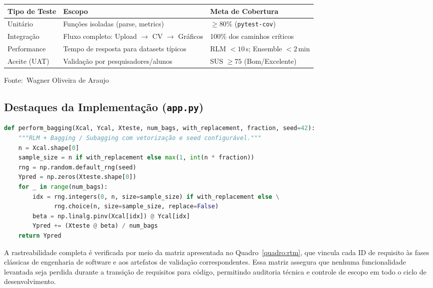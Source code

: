 \documentclass[12pt,a4paper]{article}
\newcommand{\oautor}{Wagner Oliveira de Araujo}
\begin{document}
\begin{quadro}[ht]
\centering
\small
\caption{Estratégia de testes e critérios de aceite}
\label{quadro:testes}
\begin{threeparttable}
\begin{tabularx}{\textwidth}{|l|X|X|} \hline
\textbf{Tipo de Teste} & \textbf{Escopo} & \textbf{Meta de Cobertura} \\ \hline
Unitário & Funções isoladas (parse, metrics) & $\ge 80\%$ (\texttt{pytest-cov}) \\ \hline
Integração & Fluxo completo: Upload $\rightarrow$ CV $\rightarrow$ Gráficos & 100\% dos caminhos críticos \\ \hline
Performance & Tempo de resposta para datasets típicos & RLM $< 10\,$s; Ensemble $< 2\,$min \\ \hline
Aceite (UAT) & Validação por pesquisadores/alunos & SUS $\ge 75$ (Bom/Excelente) \\ \hline
\end{tabularx}
\begin{tablenotes}[flushleft]
\footnotesize
\item Fonte:~\oautor
\end{tablenotes}
\end{threeparttable}
\end{quadro}

\subsection{Destaques da Implementação (\texttt{app.py})}
\begin{lstlisting}[language=Python]
def perform_bagging(Xcal, Ycal, Xteste, num_bags, with_replacement, fraction, seed=42):
    """RLM + Bagging / Subagging com vetorização e seed configurável."""
    n = Xcal.shape[0]
    sample_size = n if with_replacement else max(1, int(n * fraction))
    rng = np.random.default_rng(seed)
    Ypred = np.zeros(Xteste.shape[0])
    for _ in range(num_bags):
        idx = rng.integers(0, n, size=sample_size) if with_replacement else \
              rng.choice(n, size=sample_size, replace=False)
        beta = np.linalg.pinv(Xcal[idx]) @ Ycal[idx]
        Ypred += (Xteste @ beta) / num_bags
    return Ypred
\end{lstlisting}

A rastreabilidade completa é verificada por meio da matriz apresentada no Quadro~\ref{quadro:rtm}, que vincula cada ID de requisito às fases clássicas de engenharia de software e aos artefatos de validação correspondentes. Essa matriz assegura que nenhuma funcionalidade levantada seja perdida durante a transição de requisitos para código, permitindo auditoria técnica e controle de escopo em todo o ciclo de desenvolvimento.
\end{document}
